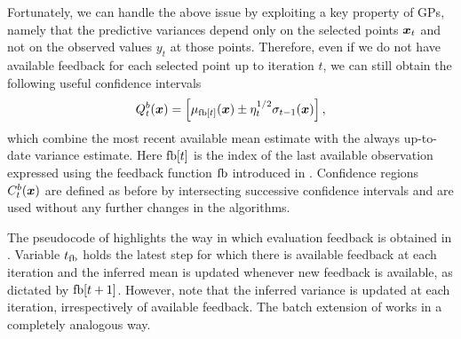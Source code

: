 Fortunately, we can handle the above issue by exploiting a key property of GPs,
namely that
the predictive variances  depend only on the selected points
$\bm{x}_t$ and not on the observed values $y_t$ at those points. Therefore,
even if we do not
have available feedback for each selected point up to iteration $t$, we
can still obtain the following useful confidence intervals
\begin{align*}
Q_t^b(\bm{x}) = \left[\mu_{\mathop{\mathrm{fb}}[t]}(\bm{x}) \pm \eta_t^{1/2}\sigma_{t-1}(\bm{x})\right],
\end{align*}
which combine the most recent available mean estimate
with the always up-to-date variance estimate.
Here $\mathop{\mathrm{fb}}[t]$ is the index of the last available observation expressed
using the feedback function $\mathop{\mathrm{fb}}$ introduced in .
Confidence regions $C_t^b(\bm{x})$ are
defined as before by intersecting successive confidence intervals and are
used without any further changes in the algorithms.

The pseudocode of  highlights the way in which
evaluation feedback is obtained in \bacl. Variable $t_{\mathop{\mathrm{fb}}}$ holds the
latest step for which there is available feedback at each iteration and
the inferred mean is updated whenever new feedback is available, as
dictated by $\mathop{\mathrm{fb}}[t+1]$. However, note that the inferred variance is
updated at each iteration, irrespectively of available feedback.
The batch extension of \iacl works in a completely analogous way.

